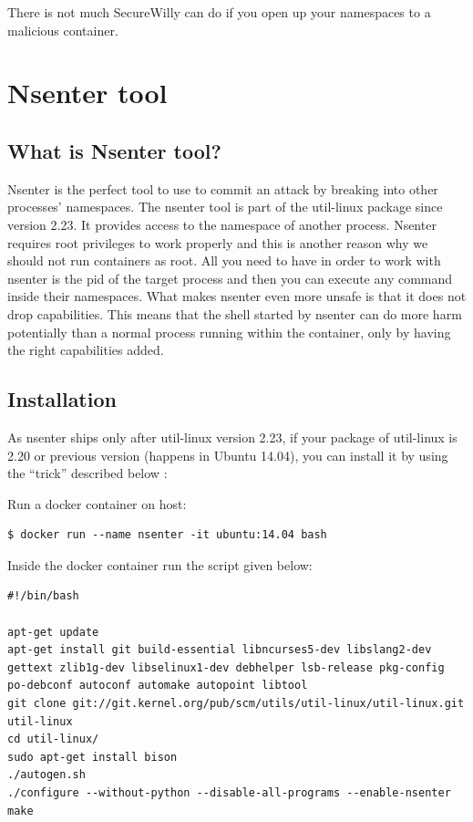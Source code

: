 There is not much SecureWilly can do if you open up your namespaces to a malicious container. 

\section{Nsenter tool}
\subsection{What is Nsenter tool?}
Nsenter is the perfect tool to use to commit an attack by breaking into other processes' namespaces. The nsenter tool is part of the util-linux package since version 2.23. It provides access to the namespace of another process. Nsenter requires root privileges to work properly and this is another reason why we should not run containers as root. All you need to have in order to work with nsenter is the pid of the target process and then you can execute any command inside their namespaces. 
What makes nsenter even more unsafe is that it does not drop capabilities. This means that the shell started by nsenter can do more harm potentially than a normal process running within the container, only by having the right capabilities added.

\subsection{Installation}
As nsenter ships only after util-linux version 2.23, if your package of util-linux is 2.20 or previous version (happens in Ubuntu 14.04), you can install it by using the “trick” described below \cite{nsentertrick} :

Run a docker container on host:
\begin{lstlisting}[style=dockercommands]
$ docker run --name nsenter -it ubuntu:14.04 bash
\end{lstlisting}

Inside the docker container run the script given below:
\begin{lstlisting}[style=bashscript, caption={Script to run inside docker container nsenter}]
#!/bin/bash

apt-get update
apt-get install git build-essential libncurses5-dev libslang2-dev gettext zlib1g-dev libselinux1-dev debhelper lsb-release pkg-config po-debconf autoconf automake autopoint libtool
git clone git://git.kernel.org/pub/scm/utils/util-linux/util-linux.git util-linux
cd util-linux/
sudo apt-get install bison
./autogen.sh
./configure --without-python --disable-all-programs --enable-nsenter
make
\end{lstlisting}

